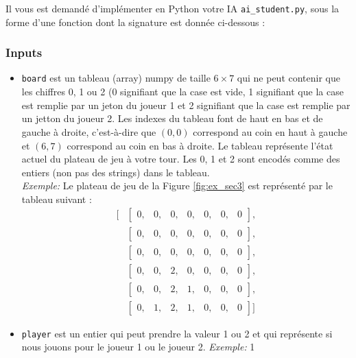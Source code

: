 \documentclass[11pt,answers]{exam}
\begin{document}
Il vous est demandé d'implémenter en Python votre IA \texttt{ai\_student.py}, sous la forme d'une fonction dont la signature est donnée ci-dessous :




\subsubsection*{Inputs}

\begin{itemize}
	\item \texttt{board} est un tableau (array) numpy de taille $6 \times 7$ qui ne peut contenir que les chiffres 0, 1 ou 2 (0 signifiant que la case est vide, 1 signifiant que la case est remplie par un jeton du joueur 1 et 2 signifiant que la case est remplie par un jetton du joueur 2. Les indexes du tableau font de haut en bas et de gauche à droite, c'est-à-dire que $(0,0)$ correspond au coin en haut à gauche et $(6,7)$ correspond au coin en bas à droite.
	Le tableau représente l'état actuel du plateau de jeu à votre tour. Les 0, 1 et 2 sont encodés comme des entiers (non pas des strings) dans le tableau.\\
	\emph{Exemple:} Le plateau de jeu de la Figure \ref{fig:ex_sec3} est représenté par le tableau suivant :
\begin{align*}
    \Bigg[ &\begin{bmatrix} 0, & 0, & 0, & 0, & 0, & 0, & 0 \end{bmatrix}, \\
    &\begin{bmatrix} 0, & 0, & 0, & 0, & 0, & 0, & 0 \end{bmatrix}, \\
    &\begin{bmatrix} 0, & 0, & 0, & 0, & 0, & 0, & 0 \end{bmatrix}, \\
    &\begin{bmatrix} 0, & 0, & 2, & 0, & 0, & 0, & 0 \end{bmatrix}, \\
    &\begin{bmatrix} 0, & 0, & 2, & 1, & 0, & 0, & 0 \end{bmatrix}, \\
    &\begin{bmatrix} 0, & 1, & 2, & 1, & 0, & 0, & 0 \end{bmatrix} \Bigg]
\end{align*}

	\item \texttt{player} est un entier qui peut prendre la valeur 1 ou 2 et qui représente si nous jouons pour le joueur 1 ou le joueur 2. \emph{Exemple:} 1
\end{itemize}
\end{document}
